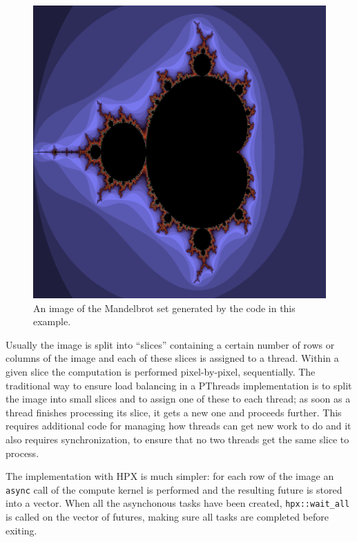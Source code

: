 \begin{figure}[h]
 	\begin{center}
 		\includegraphics[scale=0.2]{Figures/mandelbrot.png}
 		\caption{An image of the Mandelbrot set generated by the code in this example.}
 		\label{fig:mandelbrotSet}
 	\end{center}
\end{figure}

Usually the image is split into ``slices'' containing a certain number of rows or columns of the image and each of these slices is assigned to a thread. Within a given slice the computation is performed pixel-by-pixel, sequentially.
The traditional way to ensure load balancing in a PThreads implementation is to split the image into small slices and to assign one of these to each thread; as soon as a thread finishes processing its slice, it gets a new one and proceeds further.
This requires additional code for managing how threads can get new work to do and it also requires synchronization, to ensure that no two threads get the same slice to process.

The implementation with HPX is much simpler: for each row of the image an \verb:async: call of the compute kernel is performed and the resulting future is stored into a vector. When all the asynchonous tasks have been created, \verb+hpx::wait_all+ is called on the vector of futures, making sure all tasks are completed before exiting.


